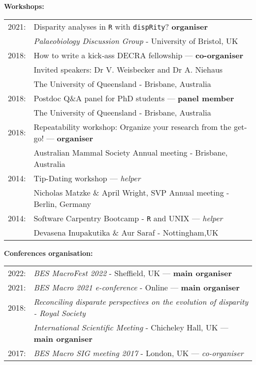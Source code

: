 \documentclass[10pt,a4paper]{article}
\begin{document}
{\bigskip
\raggedright\textbf{Workshops:}

\begin{tabular}{ll}
2021: & Disparity analyses in \texttt{R} with \texttt{dispRity}? \textbf{organiser}\\
      & \textit{Palaeobiology Discussion Group} - University of Bristol, UK\\
2018: & How to write a kick‐ass DECRA fellowship --- \textbf{co-organiser}\\
      & Invited speakers: Dr V. Weisbecker and Dr A. Niehaus\\
      & The University of Queensland - Brisbane, Australia\\
2018: & Postdoc Q\&A panel for PhD students --- \textbf{panel member}\\
      & The University of Queensland - Brisbane, Australia\\
2018: & Repeatability workshop: Organize your research from the get-go! --- \textbf{organiser}\\
      & Australian Mammal Society Annual meeting - Brisbane, Australia\\
2014: & Tip-Dating workshop --- \textit{helper}\\
      & Nicholas Matzke \& April Wright, SVP Annual meeting - Berlin, Germany\\
2014: & Software Carpentry Bootcamp - \texttt{R} and UNIX --- \textit{helper}\\
      & Devasena Inupakutika \& Aur Saraf - Nottingham,UK\\
\end{tabular}

\bigskip

\raggedright\textbf{Conferences organisation:}\\
\begin{tabular}{ll}
2022: & \textit{BES MacroFest 2022} - Sheffield, UK --- \textbf{main organiser}\\
2021: & \textit{BES Macro 2021 e-conference} - Online --- \textbf{main organiser}\\
2018: & \textit{Reconciling disparate perspectives on the evolution of disparity - Royal Society}\\
      & \textit{International Scientific Meeting} - Chicheley Hall, UK --- \textbf{main organiser}\\
2017: & \textit{BES Macro SIG meeting 2017} - London, UK --- \textit{co-organiser}\\
\end{tabular}

}
\end{document}
